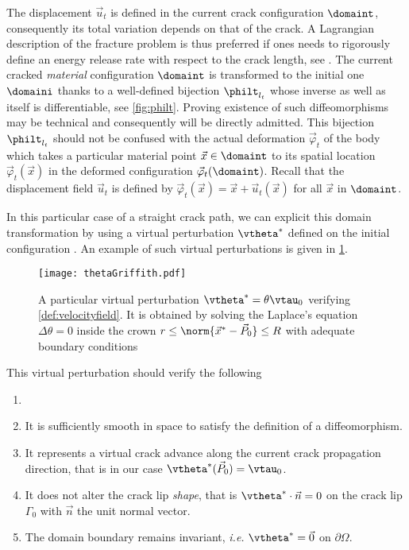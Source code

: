 The displacement $\vec{u}_t$ is defined in the current crack configuration $\domaint$, consequently its total variation depends on that of the crack. A Lagrangian description of the fracture problem is thus preferred if ones needs to rigorously define an energy release rate with respect to the crack length, see \cite{Destuynder:1981}. The current cracked \emph{material} configuration $\domaint$ is transformed to the initial one $\domaini$ thanks to a well-defined bijection $\philt_{l_t}$ whose inverse as well as itself is differentiable, see \cref{fig:philt}. Proving existence of such diffeomorphisms may be technical \cite{KhludnevSokolowskiSzulc:2010} and consequently will be directly admitted. This bijection $\philt_{l_t}$ should not be confused with the actual deformation $\vec{\varphi}_t$ of the body which takes a particular material point $\vec{x}\in\domaint$ to its spatial location $\vec{\varphi}_t(\vec{x})$ in the deformed configuration $\vec{\varphi}_t(\domaint)$. Recall that the displacement field $\vec{u}_t$ is defined by $\vec{\varphi}_t(\vec{x})=\vec{x}+\vec{u}_t(\vec{x})$ for all $\vec{x}$ in $\domaint$.

In this particular case of a straight crack path, we can explicit this domain transformation by using a virtual perturbation $\vtheta^*$ defined on the initial configuration \cite{Destuynder:1981,KhludnevSokolowskiSzulc:2010}. An example of such virtual perturbations is given in \cref{fig:exampletheta}.
\begin{figure}[htbp]
\centering
\texttt{[image: thetaGriffith.pdf]}
\caption{A particular virtual perturbation $\vtheta^*=\theta\vtau_0$ verifying \cref{def:velocityfield}. It is obtained by solving the Laplace's equation $\Delta\theta=0$ inside the crown $r\leq\norm{\vec{x}^*-\vec{P}_0}\leq R$ with adequate boundary conditions} \label{fig:exampletheta}
\end{figure}
This virtual perturbation should verify the following
\begin{definition} \label{def:velocityfield}
\begin{enumerate}
\item[]
\item It is sufficiently smooth in space to satisfy the definition of a diffeomorphism.
\item It represents a virtual crack advance along the current crack propagation direction, that is in our case $\vtheta^*(\vec{P}_0)=\vtau_0$.
\item It does not alter the crack lip \emph{shape}, that is $\vtheta^*\cdot\vec{n}=0$ on the crack lip $\Gamma_0$ with $\vec{n}$ the unit normal vector.
\item The domain boundary remains invariant, \emph{i.e.} $\vtheta^*=\vec{0}$ on $\partial\Omega$.
\end{enumerate}
\end{definition}

